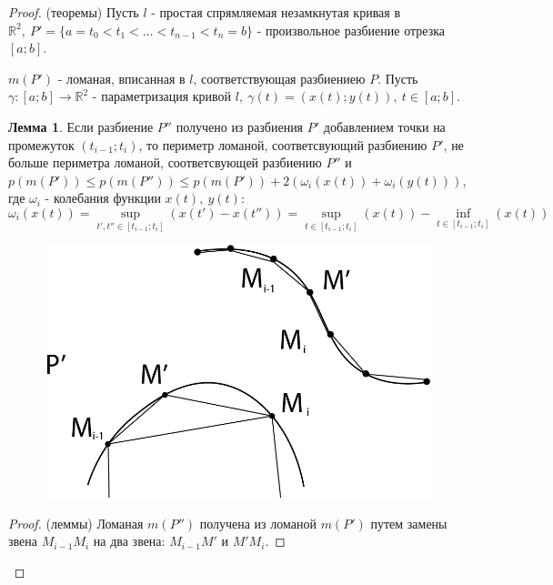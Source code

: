 \documentclass{report}
\theoremstyle{definition}
\newtheorem{lemma}{Лемма}[section]
\begin{document}
\begin{proof}
  (теоремы) Пусть $l$ - простая спрямляемая незамкнутая кривая в $\mathbb{R}^2, \ P' =
    \{a=t_0<t_1<\ldots<t_{n-1} <t_n=b\}$ - произвольное разбиение отрезка $[a;b]$.

  $m(P')$ - ломаная, вписанная в $l$, соответствующая разбиениею $P$. Пусть $\gamma:[a;b]\rightarrow
    \mathbb{R}^2$ - параметризация кривой $l, \ \gamma(t) = (x(t);y(t)), \ t\in[a;b]$.
  \begin{lemma}
    Если разбиение $P''$ получено из разбиения $P'$ добавлением точки на промежуток $(t_{i-1};t_i)$,
    то периметр ломаной, соответсвующий разбиению $P'$, не больше периметра ломаной, соответсвующей
    разбиению $P''$ и $p(m(P')) \leqslant p(m(P'')) \leqslant p(m(P')) + 2(\omega_i(x(t)) + \omega_i(y(t)))$, где
    $\omega_i$ - колебания функции $x(t), \ y(t)$:
    \begin{equation*}
      \omega_i(x(t)) = \underset{t',t''\in[t_{i-1};t_i]}{\sup}(x(t') - x(t'')) =
      \underset{t\in[t_{i-1};t_i]}{\sup}(x(t)) - \underset{t\in[t_{i-1};t_i]}{\inf}(x(t))
    \end{equation*}
    \begin{figure}[H]
      \begin{center}
        \includegraphics[scale=0.2]{graph15.png}\label{figure15}
      \end{center}
    \end{figure}
  \end{lemma}
  \begin{proof}
    (леммы) Ломаная $m(P'')$ получена из ломаной $m(P')$ путем замены звена $M_{i-1}M_i$ на два
    звена: $M_{i-1}M'$ и $M'M_i$.


\end{proof}
\end{proof}
\end{document}
